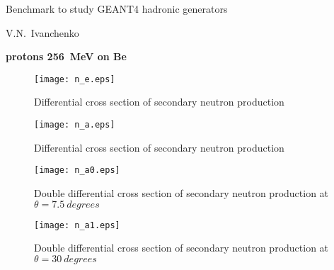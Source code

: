 \documentclass[12pt]{article}
\begin{document}
\pagestyle{empty}

\begin{center}
{\large Benchmark to study GEANT4 hadronic generators} 

\vspace*{5mm}
V.N.~Ivanchenko

\vspace*{5mm}


\vspace*{5mm}

{\bf protons 256~MeV on Be} 

\vspace*{5mm}


\end{center}



\begin{figure}[htbp]
\caption{Differential cross section of secondary neutron production}
\label{fig7}  
\centerline{\texttt{[image: n\_e.eps]}}
\end{figure}
\begin{figure}[htbp]
\caption{Differential cross section of secondary neutron production}
\label{fig10} 
\centerline{\texttt{[image: n\_a.eps]}}
\end{figure}

\clearpage


\begin{figure}[htbp]
\caption{Double differential cross section of secondary neutron production at $\theta = 7.5~degrees$}
\label{figa0} 
\centerline{\texttt{[image: n\_a0.eps]}}
\end{figure}


\begin{figure}[htbp]
\caption{Double differential cross section of secondary neutron production at $\theta = 30~degrees$}
\label{figa1} 
\centerline{\texttt{[image: n\_a1.eps]}}
\end{figure}
\end{document}
